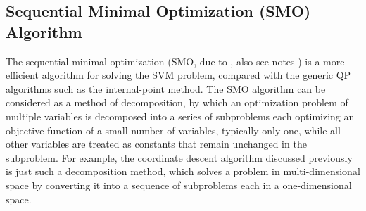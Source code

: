 \documentclass{article}
\begin{document}
\subsection{Sequential Minimal Optimization (SMO) Algorithm}



The sequential minimal optimization (SMO, due to
, also see notes
)
is a more efficient algorithm for solving the SVM problem, compared with the
generic QP algorithms such as the internal-point method. The SMO algorithm 
can be considered as a method of decomposition, by which an optimization 
problem of multiple variables is decomposed into a series of subproblems 
each optimizing an objective function of a small number of variables,
typically only one, while all other variables are treated as constants 
that remain unchanged in the subproblem. For example, the coordinate 
descent algorithm discussed previously is just such a decomposition method,
which solves a problem in multi-dimensional space by converting it into a 
sequence of subproblems each in a one-dimensional space.
\end{document}
